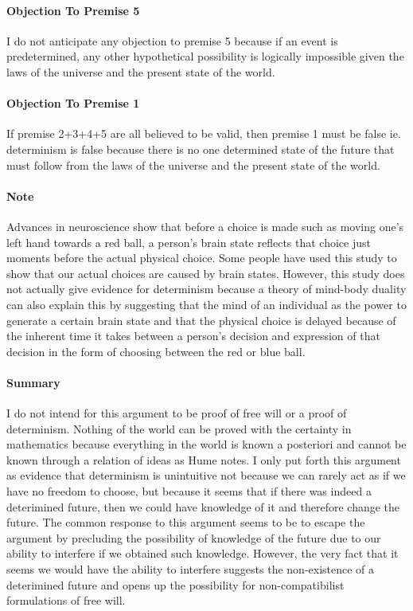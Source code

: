 \documentclass[a4paper, 12pt]{article}
\begin{document}
\paragraph{Objection To Premise 5}
I do not anticipate any objection to premise 5 because if an event is predetermined, any other hypothetical possibility is logically impossible given the laws of the universe and the present state of the world. \\
\paragraph{Objection To Premise 1}
If premise 2+3+4+5 are all believed to be valid, then premise 1 must be false ie. determinism is false because there is no one determined state of the future that must follow from the laws of the universe and the present state of the world. \\
\paragraph{Note}
Advances in neuroscience show that before a choice is made such as moving one's left hand towards a red ball, a person's brain state reflects that choice just moments before the actual physical choice. Some people have used this study to show that our actual choices are caused by brain states. However, this study does not actually give evidence for determinism because a theory of mind-body duality can also explain this by suggesting that the mind of an individual as the power to generate a certain brain state and that the physical choice is delayed because of the inherent time it takes between a person's decision and expression of that decision in the form of choosing between the red or blue ball. \\
\paragraph{Summary}
I do not intend for this argument to be proof of free will or a proof of determinism. Nothing of the world can be proved with the certainty in mathematics because everything in the world is known a posteriori and cannot be known through a relation of ideas as Hume notes. I only put forth this argument as evidence that determinism is unintuitive not because we can rarely act as if we have no freedom to choose, but because it seems that if there was indeed a deterimined future, then we could have knowledge of it and therefore change the future. The common response to this argument seems to be to escape the argument by precluding the possibility of knowledge of the future due to our ability to interfere if we obtained such knowledge. However, the very fact that it seems we would have the ability to interfere suggests the non-existence of a deterimined future and opens up the possibility for non-compatibilist formulations of free will. \\
\end{document}
